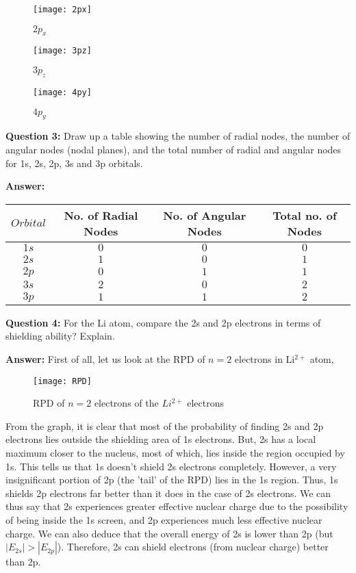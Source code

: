 \documentclass[12pt]{article}
\begin{document}
	\begin{figure}[H]
		\centering
		\texttt{[image: 2px]}
		\caption{$2p_{x}$}
	\end{figure}

	\begin{figure}[H]
		\centering
		\texttt{[image: 3pz]}
		\caption{$3p_{z}$}
	\end{figure}

	\begin{figure}[H]
		\centering
		\texttt{[image: 4py]}
		\caption{$4p_{y}$}
	\end{figure}

\pagebreak

	\textbf{Question 3: }Draw up a table showing the number of radial nodes, the number of angular nodes (nodal planes), and the total number of radial and angular nodes for 1s, 2s, 2p, 3s and 3p orbitals.
	
	\textbf{Answer: }
	
	\begin{table}[H]
		\centering
		\def\arraystretch{1.5}
		\begin{tabular}{|c|c|c|c|}
			\hline
			$Orbital$&No. of Radial Nodes&No. of Angular Nodes&Total no. of Nodes\\
			\hline
			$1s$&$0$&$0$&$0$\\
			\hline
			$2s$&$1$&$0$&$1$\\
			\hline
			$2p$&$0$&$1$&$1$\\
			\hline
			$3s$&$2$&$0$&$2$\\
			\hline
			$3p$&$1$&$1$&$2$\\
			\hline
		\end{tabular}
	\end{table}

	\textbf{Question 4: }For the Li atom, compare the 2s and 2p electrons in terms of shielding ability? Explain.
	
	\textbf{Answer: }First of all, let us look at the RPD of $n=2$ electrons in Li$^{2+}$ atom,\\
	
	\begin{figure}[H]
		\centering
		\texttt{[image: RPD]}
		\caption{RPD of $n=2$ electrons of the $Li^{2+}$ electrons}
	\end{figure}

	From the graph, it is clear that most of the probability of finding 2s and 2p electrons lies outside the shielding area of 1s electrons. But, 2s has a local maximum closer to the nucleus, most of which, lies inside the region occupied by 1s. This tells us that 1s doesn't shield 2s electrons completely. However, a very insignificant portion of 2p (the 'tail' of the RPD) lies in the 1s region. Thus, 1s shields 2p electrons far better than it does in the case of 2s electrons. We can thus say that 2s experiences greater effective nuclear charge due to the possibility of being inside the 1s screen, and 2p experiences much less effective nuclear charge. We can also deduce that the overall energy of 2s is lower than 2p (but $|E_{2s}| > |E_{2p}|$). Therefore, 2s can shield electrons (from nuclear charge) better than 2p.
	
\end{document}
